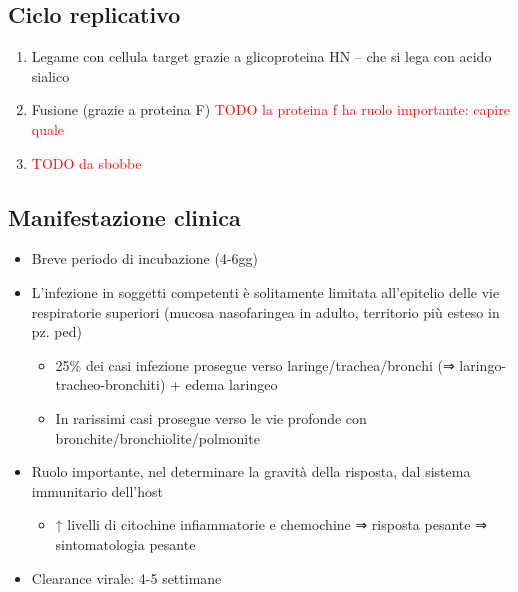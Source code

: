 \documentclass[italian,]{article}
\providecommand{\tightlist}{%
  \setlength{\itemsep}{0pt}\setlength{\parskip}{0pt}}
\newcommand{\TODO}[1]{\textcolor{red}{\textsf{\footnotesize{TODO #1}}}} %
\begin{document}
\hypertarget{ciclo-replicativo}{%
\subsection{Ciclo replicativo}\label{ciclo-replicativo}}

\begin{enumerate}
\def\labelenumi{\arabic{enumi}.}
\setcounter{enumi}{-1}
\item
  Legame con cellula target grazie a glicoproteina HN -- che si lega con
  acido sialico
\item
  Fusione (grazie a proteina F)
  \TODO{la proteina f ha ruolo importante: capire quale}
\item
  \TODO{da sbobbe}
\end{enumerate}

\hypertarget{manifestazione-clinica-1}{%
\subsection{Manifestazione clinica}\label{manifestazione-clinica-1}}

\begin{itemize}
\tightlist
\item
  Breve periodo di incubazione (4-6gg)
\item
  L'infezione in soggetti competenti è solitamente limitata all'epitelio
  delle vie respiratorie superiori (mucosa nasofaringea in adulto,
  territorio più esteso in pz. ped)

  \begin{itemize}
  \tightlist
  \item
    25\% dei casi infezione prosegue verso laringe/trachea/bronchi (⇒
    laringo-tracheo-bronchiti) + edema laringeo
  \item
    In rarissimi casi prosegue verso le vie profonde con
    bronchite/bronchiolite/polmonite
  \end{itemize}
\item
  Ruolo importante, nel determinare la gravità della risposta, dal
  sistema immunitario dell'host

  \begin{itemize}
  \tightlist
  \item
    ↑ livelli di citochine infiammatorie e chemochine ⇒ risposta pesante
    ⇒ sintomatologia pesante
  \end{itemize}
\item
  Clearance virale: 4-5 settimane
\end{itemize}
\end{document}

